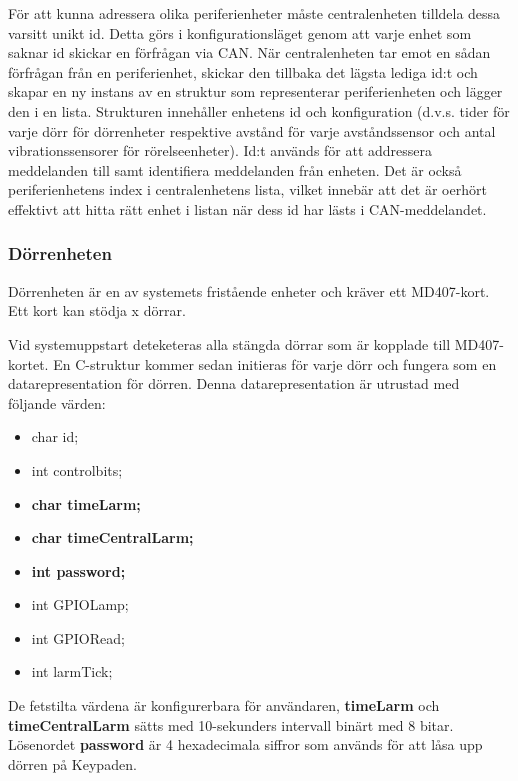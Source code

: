 \documentclass{article}
\begin{document}
För att kunna adressera olika periferienheter måste centralenheten tilldela dessa varsitt unikt id. Detta görs i konfigurationsläget genom att varje enhet som saknar id skickar en förfrågan via CAN. När centralenheten tar emot en sådan förfrågan från en periferienhet, skickar den tillbaka det lägsta lediga id:t och skapar en ny instans av en struktur som representerar periferienheten och lägger den i en
lista. Strukturen innehåller enhetens id och konfiguration (d.v.s. tider för varje dörr för dörrenheter respektive avstånd för varje avståndssensor och antal vibrationssensorer för rörelseenheter).
Id:t används för att addressera meddelanden till samt identifiera meddelanden från enheten. Det är också periferienhetens index i centralenhetens lista, vilket innebär att det är oerhört effektivt att hitta rätt enhet i listan när dess id har lästs i CAN-meddelandet.





\subsubsection{Dörrenheten}

Dörrenheten är en av systemets fristående enheter och kräver ett MD407-kort. Ett kort kan stödja x dörrar.

Vid systemuppstart deteketeras alla stängda dörrar som är kopplade till MD407-kortet. En C-struktur kommer sedan initieras för varje dörr och fungera som en  datarepresentation för dörren. Denna datarepresentation är utrustad med följande värden:
\begin{itemize}
  \item {char id;}
  \item {int controlbits;}
  \item \textbf{char time\textunderscore{}Larm;}
  \item \textbf{char time\textunderscore{}Central\textunderscore{}Larm;}
  \item \textbf{int password;}
  \item int GPIO\textunderscore{}Lamp;
  \item int GPIO\textunderscore{}Read;
  \item int larmTick;
\end{itemize}

De fetstilta värdena är konfigurerbara för användaren, \textbf{time\textunderscore{}Larm} och \\ \textbf{time\textunderscore{}Central\textunderscore{}Larm} sätts med 10-sekunders intervall binärt med 8 bitar. Lösenordet \textbf{password} är 4 hexadecimala siffror som används för att låsa upp dörren på Keypaden.
\end{document}
